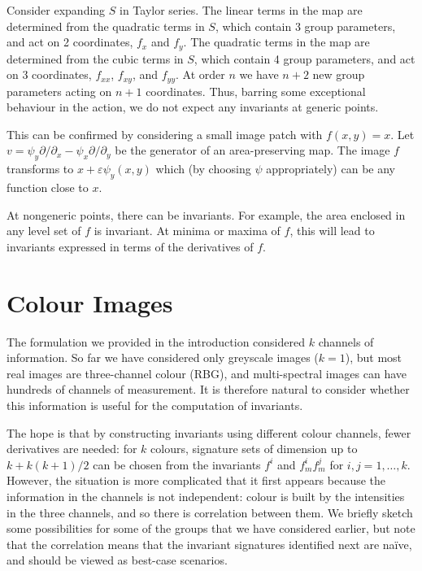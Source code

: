 \documentclass[review,onefignum,onetabnum]{siamonline190516}
\begin{document}
{Consider expanding $S$ in Taylor series. The linear terms in the map are determined from the quadratic terms in $S$, which contain 3 group parameters, and act on 2 coordinates, $f_x$ and $f_y$.  The quadratic terms in the map are determined from the cubic terms in $S$, which contain 4 group parameters, and act on 3 coordinates, $f_{xx}$, $f_{xy}$, and $f_{yy}$. At order $n$ we have $n+2$ new group parameters acting on $n+1$ coordinates. Thus, barring some exceptional behaviour in the action, we do not expect any invariants at generic points.

This can be confirmed by considering a small image patch with $f(x,y)=x.$ Let $v=\psi_y\partial/\partial_x - \psi_x\partial/\partial_y$ be the generator of an area-preserving map. The image $f$ transforms to $x + \varepsilon \psi_y(x,y)$ which (by choosing $\psi$ appropriately) can be any function close to $x$.

At nongeneric points, there can be invariants. For example, the area enclosed in any level set of $f$ is invariant. At minima or maxima of $f$, this will lead to invariants expressed in terms of the derivatives of $f$.

\section{Colour Images}\label{sec:colour}

The formulation we provided in the introduction considered $k$ channels of information. So far we have considered only greyscale images ($k=1$), but most real images are three-channel colour (RBG), and multi-spectral images can have hundreds of channels of measurement. It is therefore natural to consider whether this information is useful for the computation of invariants. 

The hope is that by constructing invariants using different colour channels, fewer derivatives are needed: for $k$ colours, signature sets of dimension up to $k + k(k+1)/2$ can be chosen from the invariants $f^i$ and $f^i_m f^j_m$ for $i,j=1,\dots, k$. However, the situation is more complicated that it first appears because the information in the channels is not independent: colour is built by the intensities in the three channels, and so there is correlation between them. We briefly sketch some possibilities for some of the groups that we have considered earlier, but note that the correlation means that the invariant signatures identified next are na\"ive, and should be viewed as best-case scenarios. 

}
\end{document}
